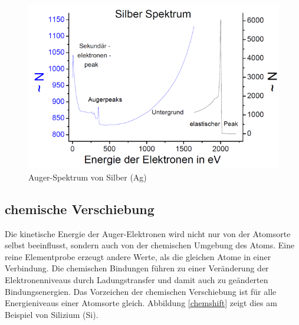 	\begin{figure}[h]
		\centering
		\includegraphics[scale=0.6]{Ag-Spektrum.png}
		\caption{Auger-Spektrum von Silber (Ag) \cite{description}}
	\end{figure}



\subsection{chemische Verschiebung} %
\label{sub:chemische_verschiebung}

	Die kinetische Energie der Auger-Elektronen wird nicht nur von der Atomsorte selbst beeinflusst, sondern auch von der chemischen Umgebung des Atoms. 
	Eine reine Elementprobe erzeugt andere Werte, als die gleichen Atome in einer Verbindung.
	Die chemischen Bindungen führen zu einer Veränderung der Elektronenniveaus durch Ladungstransfer und damit auch zu geänderten Bindungsenergien. 
	Das Vorzeichen der chemischen Verschiebung ist für alle Energieniveaus einer Atomsorte gleich.
	Abbildung \ref{chemshift} zeigt dies am Beispiel von Silizium (Si). \cite{description}

